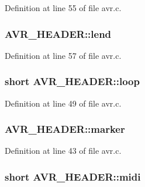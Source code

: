 Definition at line 55 of file avr.\+c.

\subsubsection[{\texorpdfstring{lend}{lend}}]{ A\+V\+R\+\_\+\+H\+E\+A\+D\+E\+R\+::lend}\hypertarget{struct_a_v_r___h_e_a_d_e_r_ae308c96e523e600f338b9d67cb751760}{}\label{struct_a_v_r___h_e_a_d_e_r_ae308c96e523e600f338b9d67cb751760}


Definition at line 57 of file avr.\+c.

\subsubsection[{\texorpdfstring{loop}{loop}}]{\setlength{\rightskip}{0pt plus 5cm}short A\+V\+R\+\_\+\+H\+E\+A\+D\+E\+R\+::loop}\hypertarget{struct_a_v_r___h_e_a_d_e_r_a497e7660901543420363306fa2c0ceea}{}\label{struct_a_v_r___h_e_a_d_e_r_a497e7660901543420363306fa2c0ceea}


Definition at line 49 of file avr.\+c.

\subsubsection[{\texorpdfstring{marker}{marker}}]{ A\+V\+R\+\_\+\+H\+E\+A\+D\+E\+R\+::marker}\hypertarget{struct_a_v_r___h_e_a_d_e_r_a7c38a7a8d7c033c8eb0face93a166ca1}{}\label{struct_a_v_r___h_e_a_d_e_r_a7c38a7a8d7c033c8eb0face93a166ca1}


Definition at line 43 of file avr.\+c.

\subsubsection[{\texorpdfstring{midi}{midi}}]{\setlength{\rightskip}{0pt plus 5cm}short A\+V\+R\+\_\+\+H\+E\+A\+D\+E\+R\+::midi}\hypertarget{struct_a_v_r___h_e_a_d_e_r_a590dd9643ace5f41a5ea79f9a05ac65e}{}\label{struct_a_v_r___h_e_a_d_e_r_a590dd9643ace5f41a5ea79f9a05ac65e}



